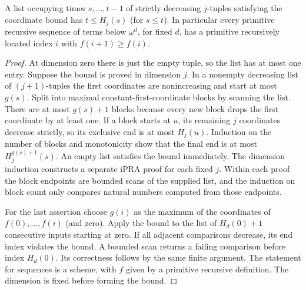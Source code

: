 \begin{theorem}
A list occupying times $s,\ldots,t-1$ of strictly decreasing
$j$-tuples satisfying the coordinate bound has $t\le H_j(s)$
(for $s\le t$). In particular every primitive recursive sequence of
terms below $\omega^d$, for fixed $d$, has a primitive recursively
located index $i$ with $f(i+1)\ge f(i)$.
\end{theorem}
\begin{proof}
At dimension zero there is just the empty tuple, so the list has
at most one entry. Suppose the bound is proved in dimension $j$.
In a nonempty decreasing list of $(j+1)$-tuples the first coordinates
are nonincreasing and start at most $g(s)$. Split into maximal
constant-first-coordinate blocks by scanning the list. There are at
most $g(s)+1$ blocks because every new block drops the first coordinate
by at least one. If a block starts at $u$, its remaining $j$ coordinates
decrease strictly, so its exclusive end is at most $H_j(u)$.
Induction on the number of blocks and monotonicity show that the final
end is at most $H_j^{g(s)+1}(s)$. An empty list satisfies the bound
immediately. The dimension induction constructs a separate iPRA proof
for each fixed $j$. Within each proof the block endpoints are bounded
scans of the supplied list, and the induction on block count only
compares natural numbers computed from those endpoints.

For the last assertion choose $g(i)$ as the maximum of the coordinates
of $f(0),\ldots,f(i)$ (and zero). Apply the bound to the list of
$H_d(0)+1$ consecutive inputs starting at zero. If all adjacent
comparisons decrease, its end index violates the bound. A bounded
scan returns a failing comparison before index $H_d(0)$. Its correctness follows by the same finite argument. The statement for
sequences is a scheme, with $f$ given by a primitive recursive
definition. The dimension is fixed before forming the bound.
\end{proof}
